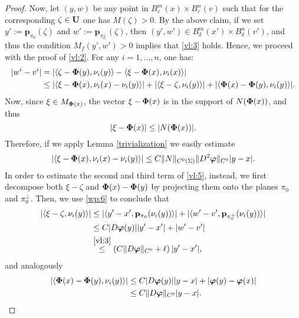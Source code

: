 \documentclass[a4paper,11pt,reqno]{amsart}
\theoremstyle{definition}
\numberwithin{equation}{section}
\numberwithin{subsection}{section}
\newcommand{\bphi}{\boldsymbol{\varphi}}
\newcommand{\p}{\mathbf{p}}
\begin{document}
\begin{proof}
Now, let $(y,w)$ be any point in $B^{m}_{\varepsilon}(x) \times B^{n}_{\varepsilon}(v)$ such that for the corresponding $\zeta \in {\bf U}$ one has $M(\zeta) > 0$. By the above claim, if we set $y' := \p_{\pi_{0}}(\zeta)$ and $w' := \p_{\pi_{0}^{\perp}}(\zeta)$, then $(y',w') \in B^{m}_{\delta}(x') \times B^{n}_{\delta}(v')$, and thus the condition $M_{f}(y',w') > 0$ implies that \eqref{vl:3} holds. Hence, we proceed with the proof of \eqref{vl:2}. For any $i = 1,\dots,n$, one has:
\begin{equation} \label{vl:5}
\begin{split}
|w^{i} - v^{i}| &= \left| \langle \zeta - {\bf \Phi}(y), \nu_{i}(y) \rangle - \langle \xi - {\bf \Phi}(x), \nu_{i}(x) \rangle \right| \\
&\leq |\langle \xi - {\bf \Phi}(x), \nu_{i}(x) - \nu_{i}(y) \rangle| + |\langle \xi - \zeta, \nu_{i}(y) \rangle| + |\langle {\bf \Phi}(x) - {\bf \Phi}(y), \nu_{i}(y) \rangle|. \\
\end{split} 
\end{equation}
Now, since $\xi \in M_{{\bf \Phi}(x)}$, the vector $\xi - {\bf \Phi}(x)$ is in the support of $N({\bf \Phi}(x))$, and thus
\[
|\xi - {\bf \Phi}(x)| \leq |N({\bf \Phi}(x))|.
\]
Therefore, if we apply Lemma \ref{trivialization} we easily estimate
\begin{equation} \label{vl:5a}
|\langle \xi - {\bf \Phi}(x), \nu_{i}(x) - \nu_{i}(y) \rangle| \leq C \| N \|_{C^{0}(\Sigma)} \| D^{2} \bphi \|_{C^{0}} |y - x|.
\end{equation}
In order to estimate the second and third term of \eqref{vl:5}, instead, we first decompose both $\xi - \zeta$ and ${\bf \Phi}(x) - {\bf \Phi}(y)$ by projecting them onto the planes $\pi_0$ and $\pi_{0}^{\perp}$. Then, we use \eqref{wp:6} to conclude that
\begin{equation} \label{vl:5b}
\begin{split}
|\langle \xi - \zeta, \nu_{i}(y) \rangle| &\leq |\langle y' - x', \p_{\pi_{0}}(\nu_{i}(y)) \rangle| + |\langle w' - v', \p_{\pi_{0}^{\perp}}(\nu_{i}(y)) \rangle| \\
&\leq C |D\bphi(y)| |y' - x'| + |w' - v'| \\
&\overset{\eqref{vl:3}}{\leq} \left( C \| D\bphi \|_{C^0} + \ell \right) |y' - x'|,  
\end{split}
\end{equation}
and analogously
\begin{equation} \label{vl:5c}
\begin{split}
|\langle {\bf \Phi}(x) - {\bf \Phi}(y), \nu_{i}(y) \rangle| &\leq C |D\bphi(y)| |y - x| + |\bphi(y) - \bphi(x)| \\
&\leq C \| D\bphi \|_{C^0} |y - x|. 
\end{split}
\end{equation}


\end{proof}
\end{document}
